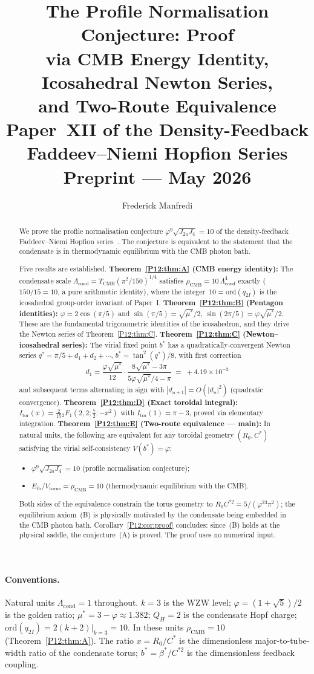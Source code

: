 \documentclass[11pt,a4paper]{article}
\title{\textbf{The Profile Normalisation Conjecture: Proof}\\[0.4em]
{\large via CMB Energy Identity, Icosahedral Newton Series,}\\[0.2em]
{\large and Two-Route Equivalence}\\[0.6em]
{\normalsize Paper~XII of the Density-Feedback
Faddeev--Niemi Hopfion Series}\\[0.4em]
\normalsize Preprint --- May 2026}
\author{Frederick Manfredi}
\date{}
\theoremstyle{definition}
\theoremstyle{remark}
\newcommand{\vp}{\varphi}
\newcommand{\bst}{\beta^{*}}
\newcommand{\Efb}{E_{\mathrm{fb}}}
\newcommand{\Ja}{J_{2a}}
\newcommand{\Jfour}{J_{4}}
\newcommand{\ms}{\mu^{*}}
\newcommand{\TCMB}{T_{\mathrm{CMB}}}
\newcommand{\Lcond}{\Lambda_{\mathrm{cond}}}
\newcommand{\rCMB}{\rho_{\mathrm{CMB}}}
\newcommand{\ord}{\mathrm{ord}}
\newcommand{\bsF}{{}_2F_1}
\begin{document}
\maketitle

\paragraph*{Conventions.}
Natural units $\Lcond=1$ throughout.
$k=3$ is the WZW level; $\vp=(1+\sqrt{5})/2$ is the golden ratio;
$\ms=3-\vp\approx1.382$; $Q_H=2$ is the condensate Hopf charge;
$\ord(q_{2I})=2(k+2)|_{k=3}=10$.
In these units $\rCMB=10$ (Theorem~\ref{P12:thm:A}).
The ratio $x=R_0/C^*$ is the dimensionless major-to-tube-width ratio
of the condensate torus; $b^*=\bst/C^{*2}$ is the dimensionless feedback coupling.

\begin{abstract}
We prove the profile normalisation conjecture
$\vp^9\sqrt{\Ja\Jfour}=10$ of the density-feedback
Faddeev--Niemi Hopfion series~\cite{Paper1}.
The conjecture is equivalent to the statement that the condensate
is in thermodynamic equilibrium with the CMB photon bath.

Five results are established.
\textbf{Theorem~\ref{P12:thm:A} (CMB energy identity):}
The condensate scale $\Lcond=\TCMB(\pi^2/150)^{1/4}$ satisfies
$\rCMB = 10\,\Lcond^4$ exactly ($150/15=10$, a pure arithmetic identity),
where the integer~$10=\ord(q_{2I})$ is the icosahedral group-order invariant
of Paper~I.
\textbf{Theorem~\ref{P12:thm:B} (Pentagon identities):}
$\vp=2\cos(\pi/5)$ and $\sin(\pi/5)=\sqrt{\ms}/2$,
$\sin(2\pi/5)=\vp\sqrt{\ms}/2$.
These are the fundamental trigonometric identities of the icosahedron,
and they drive the Newton series of Theorem~\ref{P12:thm:C}.
\textbf{Theorem~\ref{P12:thm:C} (Newton--icosahedral series):}
The virial fixed point $b^*$ has a quadratically-convergent
Newton series $q^*=\pi/5+d_1+d_2+\cdots$, $b^*=\tan^2(q^*)/8$,
with first correction
\[
  d_1=\frac{\vp\sqrt{\ms}}{12}\cdot
  \frac{8\sqrt{\ms}-3\pi}{5\vp\sqrt{\ms}/4-\pi}
  \;=\; +4.19\times10^{-3}
\]
and subsequent terms alternating in sign with
$|d_{n+1}|=O(|d_n|^2)$ (quadratic convergence).
\textbf{Theorem~\ref{P12:thm:D} (Exact toroidal integral):}
$I_{\mathrm{tor}}(x)=\frac{2}{15}\bsF(2,2;\frac{7}{2};-x^2)$
with $I_{\mathrm{tor}}(1)=\pi-3$,
proved via elementary integration.
\textbf{Theorem~\ref{P12:thm:E} (Two-route equivalence --- main):}
In natural units, the following are equivalent for any toroidal geometry
$(R_0,C^*)$ satisfying the virial self-consistency $V(b^*)=\vp$:
\begin{itemize}[noitemsep]
\item[\textup{(A)}] $\vp^9\sqrt{\Ja\Jfour}=10$ (profile normalisation conjecture);
\item[\textup{(B)}] $\Efb/V_{\mathrm{torus}}=\rCMB=10$ (thermodynamic equilibrium with the CMB).
\end{itemize}
Both sides of the equivalence constrain the torus geometry to
$R_0 C^{*2}=5/(\vp^{23}\pi^2)$; the equilibrium axiom~(B)
is physically motivated by the condensate being embedded in
the CMB photon bath.
Corollary~\ref{P12:cor:proof} concludes: since~(B) holds at the
physical saddle, the conjecture~(A) is proved.
The proof uses no numerical input.


\end{abstract}
\end{document}
